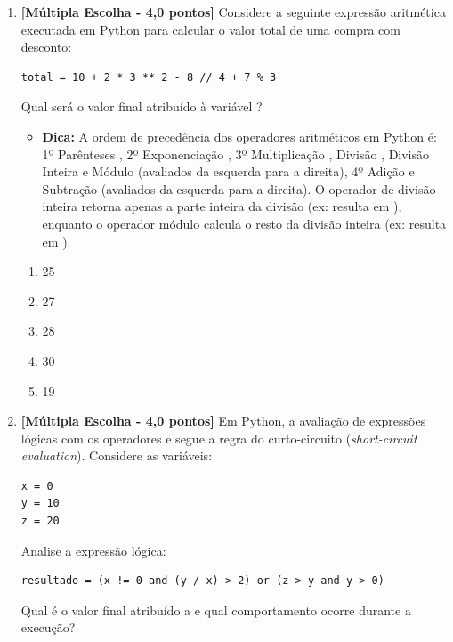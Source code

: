 \begin{enumerate}[label=\textbf{Q\arabic*.}, start=1]

\item \textbf{[Múltipla Escolha - 4,0 pontos]} Considere a seguinte expressão aritmética executada em Python para calcular o valor total de uma compra com desconto:
\begin{verbatim}
total = 10 + 2 * 3 ** 2 - 8 // 4 + 7 % 3
\end{verbatim}
Qual será o valor final atribuído à variável ?

\begin{itemize}[leftmargin=*]
    \item \textbf{Dica:} A ordem de precedência dos operadores aritméticos em Python é: 1º Parênteses \code{()}, 2º Exponenciação \code{**}, 3º Multiplicação \code{*}, Divisão \code{/}, Divisão Inteira \code{//} e Módulo \code{\%} (avaliados da esquerda para a direita), 4º Adição \code{+} e Subtração \code{-} (avaliados da esquerda para a direita). O operador de divisão inteira \code{//} retorna apenas a parte inteira da divisão (ex:  resulta em ), enquanto o operador módulo \code{\%} calcula o resto da divisão inteira (ex:  resulta em ).
\end{itemize}

\begin{enumerate}[label=\textbf{(\Alph*)}]
    \item 25
    \item 27
    \item 28
    \item 30
    \item 19
\end{enumerate}



\vspace{0.4cm}

\item \textbf{[Múltipla Escolha - 4,0 pontos]} Em Python, a avaliação de expressões lógicas com os operadores  e  segue a regra do curto-circuito (\emph{short-circuit evaluation}). Considere as variáveis:
\begin{verbatim}
x = 0
y = 10
z = 20
\end{verbatim}
Analise a expressão lógica:
\begin{verbatim}
resultado = (x != 0 and (y / x) > 2) or (z > y and y > 0)
\end{verbatim}
Qual é o valor final atribuído a  e qual comportamento ocorre durante a execução?


\end{enumerate}
